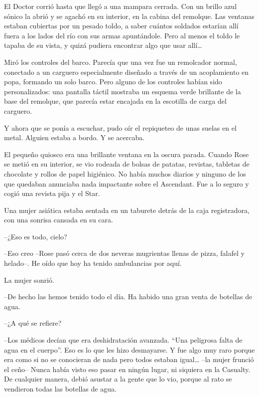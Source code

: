 {El Doctor corrió hasta que llegó a una mampara cerrada. Con un brillo
 azul sónico la abrió y se agachó en su interior, en la cabina del
 remolque. Las ventanas estaban cubiertas por un pesado toldo, a saber
 cuántos soldados estarían allí fuera a los lados del río con sus armas
 apuntándole. Pero al menos el toldo le tapaba de su vista, y quizá
 pudiera encontrar algo que usar allí\ldots{}}

{Miró los controles del barco. Parecía que una vez fue un remolcador
 normal, conectado a un carguero especialmente diseñado a través de un
 acoplamiento en popa, formando un solo barco. Pero alguno de los
 controles habían sido personalizados: una pantalla táctil mostraba un
 esquema verde brillante de la base del remolque, que parecía estar
encajada en la escotilla de carga del carguero.}

{Y ahora que se ponía a escuchar, pudo oír el repiqueteo de unas suelas
en el metal. Alguien estaba a bordo. Y se acercaba.}

\mbox{}

{El pequeño quiosco era una brillante ventana en la oscura parada.
 Cuando Rose se metió en su interior, se vio rodeada de bolsas de
 patatas, revistas, tabletas de chocolate y rollos de papel higiénico. No
 había muchos diarios y ninguno de los que quedaban anunciaba nada
 impactante sobre el Ascendant. Fue a lo seguro y cogió una revista pija
y el Star.}

{Una mujer asiática estaba sentada en un taburete detrás de la caja
registradora, con una sonrisa cansada en su cara.}

{--¿Eso es todo, cielo?}

{--Eso creo --Rose pasó cerca de dos neveras mugrientas llenas de pizza,
falafel y helado--. He oído que hoy ha tenido ambulancias por aquí.}

{La mujer sonrió.}

{--De hecho las hemos tenido todo el día. Ha habido una gran venta de
botellas de agua.}

{--¿A qué se refiere?}

{--Los médicos decían que era deshidratación avanzada. ``Una peligrosa
 falta de agua en el cuerpo''. Eso es lo que les hizo desmayarse. Y fue
 algo muy raro porque era como si no se conocieran de nada pero todos
 estaban igual\ldots{} --la mujer frunció el ceño-- Nunca había visto eso
 pasar en ningún lugar, ni siquiera en la Casualty. De cualquier manera,
 debió asustar a la gente que lo vio, porque al rato se vendieron todas
las botellas de agua.}

